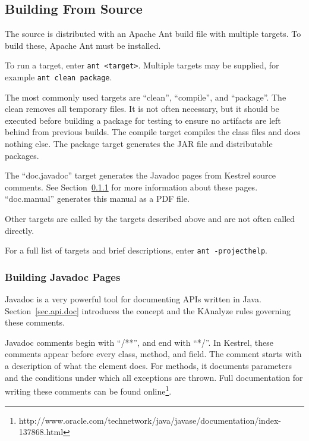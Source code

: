 \subsection{Building From Source}
\label{sec.suppl.building}

The source is distributed with an Apache Ant build file with multiple targets. To build these, Apache Ant must be installed.

To run a target, enter \texttt{ant <target>}. Multiple targets may be supplied, for example \texttt{ant clean package}.

The most commonly used targets are ``clean'', ``compile'', and ``package''. The clean removes all temporary files. It is not often necessary, but it should be executed before building a package for testing to ensure no artifacts are left behind from previous builds. The compile target compiles the class files and does nothing else. The package target generates the JAR file and distributable packages.

The ``doc.javadoc'' target generates the Javadoc pages from Kestrel source comments. See Section~\ref{sec.suppl.building.javadoc} for more information about these pages. ``doc.manual'' generates this manual as a PDF file.

Other targets are called by the targets described above and are not often called directly.

For a full list of targets and brief descriptions, enter \texttt{ant -projecthelp}.


\subsubsection{Building Javadoc Pages}
\label{sec.suppl.building.javadoc}

Javadoc is a very powerful tool for documenting APIs written in Java. Section~\ref{sec.api.doc} introduces the concept and the KAnalyze rules governing these comments.

Javadoc comments begin with ``/**'', and end with ``*/''. In Kestrel, these comments appear before every class, method, and field. The comment starts with a description of what the element does. For methods, it documents parameters and the conditions under which all exceptions are thrown. Full documentation for writing these comments can be found online\footnote{http://www.oracle.com/technetwork/java/javase/documentation/index-137868.html}. 

